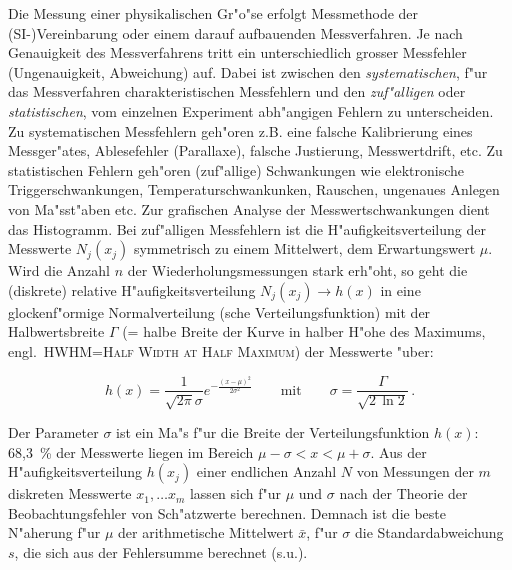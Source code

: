 Die Messung einer physikalischen Gr"o"se
erfolgt %
Messmethode der (SI-)Vereinbarung oder einem darauf aufbauenden
Messverfahren. Je nach Genauigkeit des Messverfahrens tritt ein
unterschiedlich grosser Messfehler (Ungenauigkeit, Abweichung) auf.
Dabei ist zwischen den \emph{systematischen}, f"ur das Messverfahren
charakteristischen Messfehlern und den
\emph{zuf"alligen} oder \emph{statistischen}, vom einzelnen
Experiment abh"angigen Fehlern zu unterscheiden. Zu systematischen
Messfehlern geh"oren z.B. eine falsche Kalibrierung eines
Messger"ates, Ablesefehler (Parallaxe), falsche Justierung,
Messwertdrift, etc. Zu statistischen Fehlern geh"oren (zuf"allige)
Schwankungen wie elektronische Triggerschwankungen,
Temperaturschwankunken, Rauschen, ungenaues Anlegen von Ma"sst"aben
etc. Zur grafischen Analyse der Messwertschwankungen dient das
Histogramm. Bei zuf"alligen Messfehlern ist die H"aufigkeitsverteilung
der Messwerte $N_j(x_j)$ symmetrisch zu einem Mittelwert, dem
Erwartungswert $\mu$. Wird die Anzahl $n$ der Wiederholungsmessungen
stark erh"oht, so geht die (diskrete) relative H"aufigkeitsverteilung
$N_j(x_j) \rightarrow h(x)$ in eine glockenf"ormige Normalverteilung
(sche Verteilungsfunktion) mit der
Halbwertsbreite $\Gamma$ (= halbe Breite der Kurve
in halber H"ohe des Maximums, engl.~\textsc{HWHM=Half Width at Half
Maximum}) der Messwerte "uber:
%
\begin{important}
\begin{equation}\label{e:gaussnormal}
    h(x) = \frac{1}{\sqrt{2 \pi}\sigma} e^{-\frac{(x-\mu)^2}{2 \sigma^2}}
    \qquad \mbox{mit} \qquad
    \sigma = \frac{\Gamma}{\sqrt{2 \, \ln 2}} \, .
\end{equation}
\end{important}

Der Parameter $\sigma$ ist ein Ma"s f"ur die Breite der
Verteilungsfunktion $h(x)$: 68,3~\% der Messwerte liegen im Bereich
$\mu - \sigma < x < \mu + \sigma $. Aus der H"aufigkeitsverteilung $h(x_j)$
einer endlichen Anzahl $N$ von Messungen der $m$ diskreten
Messwerte $x_1, \ldots x_m$ lassen sich f"ur 
$\mu$ und $\sigma$ nach der Theorie der
Beobachtungsfehler von  Sch"atzwerte berechnen.
Demnach ist die beste N"aherung f"ur $\mu$ der arithmetische
Mittelwert $\bar{x}$, f"ur $\sigma$ die
Standardabweichung $s$, die sich aus der
Fehlersumme berechnet (s.u.). 

